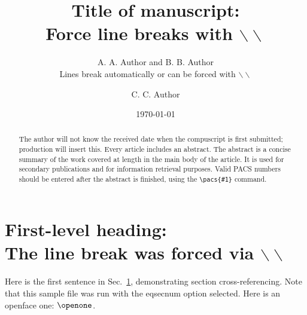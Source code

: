 %
%
%
%
%
%
\def\btt#1{{\tt$\backslash$#1}}

\draft
{}
\title{Title of manuscript:\\
Force line breaks with $\backslash\backslash$
}
\author{A. A.  Author and B. B. Author\cite{byline}\\
Lines break automatically or can be forced
with $\backslash\backslash$}
\address{
Authors' institution and/or address\\
This line break forced with $\backslash\backslash$
}
\author{C. C. Author}
\address{
Second author institution and/or address\\
This line break forced with $\backslash\backslash$
}
\date{\today}
\maketitle
\begin{abstract}
The author will not know the received date when the compuscript
is first submitted; production will insert this. Every
article includes an abstract.  The abstract is a concise
summary of the work covered at length
in the main body of the article.
It is used for secondary publications and for information retrieval
purposes. Valid PACS numbers should be entered after the abstract
is finished, using the \verb+\pacs{#1}+ command.
\end{abstract}

\narrowtext

\section{First-level heading:\protect\\ The line break was forced via
$\backslash\backslash$}
\label{sec:level1}

Here is the first sentence in Sec.\ \ref{sec:level1}, demonstrating
section cross-referencing. Note that this sample file was run
with the eqsecnum option selected.
Here is an openface one: $\openone$.

